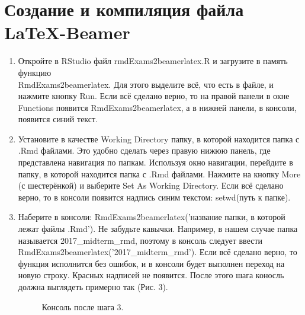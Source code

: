 \documentclass[11pt, a4paper]{extarticle}
\newcommand{\code}[1]{{\color{blue} #1}}
\newcommand{\form}[1]{{\color{magenta} #1}}
\begin{document}
\section{Создание и компиляция файла \LaTeX-Beamer}
\begin{enumerate}
	\item Откройте в \form{RStudio} файл \form{rmdExams2beamerlatex.R} и загрузите в память функцию \\ \code{RmdExams2beamerlatex}. Для этого выделите всё, что есть в файле, и нажмите кнопку \form{Run}. Если всё сделано верно, то на правой панели в окне \form{Functions} появится \form{RmdExams2beamerlatex}, а в нижней панели, в консоли, появится синий текст.
	
	\item Установите в качестве \form{Working Directory} папку, в которой находится папка с \form{.Rmd} файлами. Это удобно сделать через правую нижюю панель, где представлена навигация по папкам. Используя окно навигации, перейдите в папку, в которой находится папка с \form{.Rmd} файлами. Нажмите на кнопку \form{More} (с шестерёнкой) и выберите \form{Set As Working Directory}. Если всё сделано верно, то в консоли появится надпись синим текстом: \code{setwd(путь к папке)}.
	
	\item Наберите в консоли: \code{RmdExams2beamerlatex('название папки, в которой лежат файлы .Rmd')}. Не забудьте кавычки. Например, в нашем случае папка называется \form{2017\_midterm\_rmd}, поэтому в консоль следует ввести \code{RmdExams2beamerlatex('2017\_midterm\_rmd')}. Если всё сделано верно, то функция исполнится без ошибок, и в консоли будет выполнен переход на новую строку. Красных надписей не появится. После этого шага коносль должна выглядеть примерно так (Рис. 3).
	
	\begin{figure}[h!]
		\centering
		\caption{Консоль после шага 3.}
	\end{figure}
	

\end{enumerate}
\end{document}

